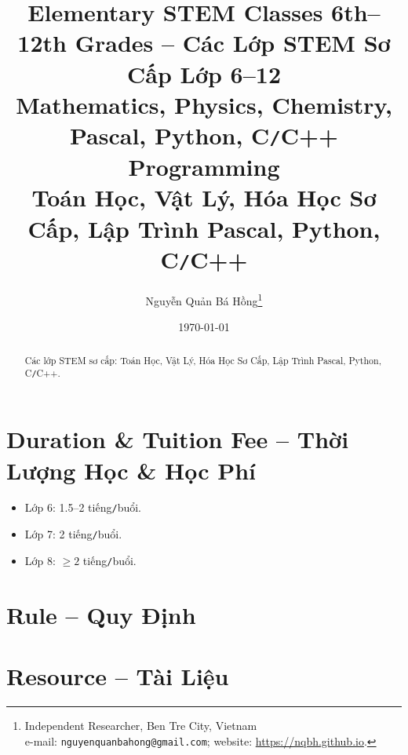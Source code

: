 \documentclass{article}
\title{Elementary STEM Classes 6th--12th Grades -- Các Lớp STEM Sơ Cấp Lớp 6--12\\Mathematics, Physics, Chemistry, Pascal, Python, C{\tt/}C++ Programming\\Toán Học, Vật Lý, Hóa Học Sơ Cấp, Lập Trình Pascal, Python, C{\tt/}C++}
\author{Nguyễn Quản Bá Hồng\footnote{Independent Researcher, Ben Tre City, Vietnam\\e-mail: \texttt{nguyenquanbahong@gmail.com}; website: \url{https://nqbh.github.io}.}}
\date{\today}
\numberwithin{equation}{section}
\begin{document}
\maketitle
\begin{abstract}
	Các lớp STEM sơ cấp: Toán Học, Vật Lý, Hóa Học Sơ Cấp, Lập Trình Pascal, Python, C{\tt/}C++.
\end{abstract}
\setcounter{secnumdepth}{4}
\setcounter{tocdepth}{3}
\tableofcontents


\section{Duration \& Tuition Fee -- Thời Lượng Học \& Học Phí}

\begin{itemize}
	\item Lớp 6: 1.5--2 tiếng{\tt/}buổi.
	\item Lớp 7: 2 tiếng{\tt/}buổi.
	\item Lớp 8: $\ge2$ tiếng{\tt/}buổi.
\end{itemize}


\section{Rule -- Quy Định}


\section{Resource -- Tài Liệu}


\printbibliography[heading=bibintoc]
	
\end{document}
